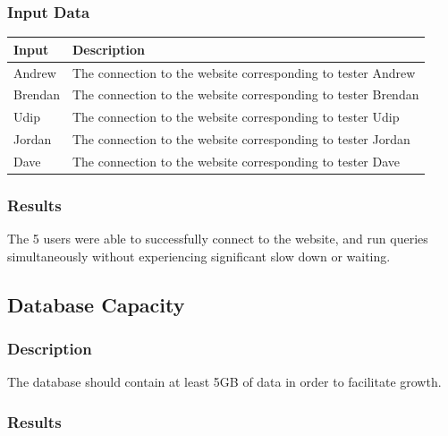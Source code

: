 \documentclass{scrreprt}
\begin{document}
\subsubsection{Input Data}
\begin{table}[H]
        \centering
        \begin{tabular}{p{3cm}p{6cm}}
                \hline\hline
                Input & Description\\
                \hline\hline
                Andrew & The connection to the website corresponding to tester Andrew \\
                \hline
                Brendan & The connection to the website corresponding to tester Brendan \\
                \hline
                Udip & The connection to the website corresponding to tester Udip \\
                \hline
                Jordan & The connection to the website corresponding to tester Jordan \\
                \hline
                Dave & The connection to the website corresponding to tester Dave \\
                \hline
        \end{tabular}
\end{table}

\subsubsection{Results}

The 5 users were able to successfully connect to the website, and run queries
simultaneously without experiencing significant slow down or waiting.

\subsection{Database Capacity}
\subsubsection{Description}

The database should contain at least 5GB of data in order to facilitate growth.

\subsubsection{Results}
\end{document}
